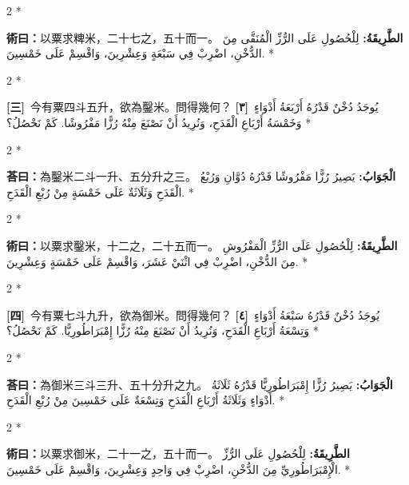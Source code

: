 \documentclass[11pt,a4paper]{article}
\newcommand{\ar}[1]{\arabicfont\beginR #1\endR}
\newcommand{\problemnum}[1]{\textbf{[\ignorespaces#1\unskip]}}
\newenvironment{bilingual}{%
  \begin{paracol}{2}%
  \switchcolumn[0]*%
}{%
  \end{paracol}%
}
\newcommand{\cnline}[1]{\switchcolumn[0]\noindent #1 \switchcolumn[1]}
\newcommand{\arline}[1]{\noindent\ar{#1} \switchcolumn[0]*}
\newenvironment{prob bilingual}{%
  \begin{paracol}{2}%
  \switchcolumn[0]*%
}{%
  \end{paracol}%
  \vspace{0.3em}%
}
\begin{document}
\begin{bilingual}
\cnline{%
\textcolor{methodcolor}{\textbf{術曰：}}以粟求粺米，二十七之，五十而一。
}
\arline{%
\textcolor{methodcolor}{\textbf{الطَّرِيقَةُ:}} لِلْحُصُولِ عَلَى الرُّزِّ الْمُنَقَّى مِنَ الدُّخْنِ، اضْرِبْ فِي سَبْعَةٍ وَعِشْرِينَ، وَاقْسِمْ عَلَى خَمْسِينَ.
}
\end{bilingual}

\begin{bilingual}
\cnline{\problemnum{三}\, 今有粟四斗五升，欲為鑿米。問得幾何？}
\arline{\problemnum{٣}\, يُوجَدُ دُخْنٌ قَدْرُهُ أَرْبَعَةُ أَدْوَاءٍ وَخَمْسَةُ أَرْبَاعِ الْقَدَحِ، وَنُرِيدُ أَنْ نَصْنَعَ مِنْهُ رُزًّا مَفْرُوشًا. كَمْ نَحْصُلُ؟}
\end{bilingual}

\begin{bilingual}
\cnline{\textcolor{answercolor}{\textbf{荅曰：}}為鑿米二斗一升、五分升之三。}
\arline{\textcolor{answercolor}{\textbf{الْجَوَابُ:}} يَصِيرُ رُزًّا مَفْرُوشًا قَدْرُهُ دُوَّانِ وَرُبْعُ الْقَدَحِ وَثَلَاثَةٌ عَلَى خَمْسَةٍ مِنْ رُبْعِ الْقَدَحِ.}
\end{bilingual}

\begin{bilingual}
\cnline{%
\textcolor{methodcolor}{\textbf{術曰：}}以粟求鑿米，十二之，二十五而一。
}
\arline{%
\textcolor{methodcolor}{\textbf{الطَّرِيقَةُ:}} لِلْحُصُولِ عَلَى الرُّزِّ الْمَفْرُوشِ مِنَ الدُّخْنِ، اضْرِبْ فِي اثْنَيْ عَشَرَ، وَاقْسِمْ عَلَى خَمْسَةٍ وَعِشْرِينَ.
}
\end{bilingual}

\begin{bilingual}
\cnline{\problemnum{四}\, 今有粟七斗九升，欲為御米。問得幾何？}
\arline{\problemnum{٤}\, يُوجَدُ دُخْنٌ قَدْرُهُ سَبْعَةُ أَدْوَاءٍ وَتِسْعَةُ أَرْبَاعِ الْقَدَحِ، وَنُرِيدُ أَنْ نَصْنَعَ مِنْهُ رُزًّا إِمْبَرَاطُورِيًّا. كَمْ نَحْصُلُ؟}
\end{bilingual}

\begin{bilingual}
\cnline{\textcolor{answercolor}{\textbf{荅曰：}}為御米三斗三升、五十分升之九。}
\arline{\textcolor{answercolor}{\textbf{الْجَوَابُ:}} يَصِيرُ رُزًّا إِمْبَرَاطُورِيًّا قَدْرُهُ ثَلَاثَةُ أَدْوَاءٍ وَثَلَاثَةُ أَرْبَاعِ الْقَدَحِ وَتِسْعَةٌ عَلَى خَمْسِينَ مِنْ رُبْعِ الْقَدَحِ.}
\end{bilingual}

\begin{bilingual}
\cnline{%
\textcolor{methodcolor}{\textbf{術曰：}}以粟求御米，二十一之，五十而一。
}
\arline{%
\textcolor{methodcolor}{\textbf{الطَّرِيقَةُ:}} لِلْحُصُولِ عَلَى الرُّزِّ الْإِمْبَرَاطُورِيِّ مِنَ الدُّخْنِ، اضْرِبْ فِي وَاحِدٍ وَعِشْرِينَ، وَاقْسِمْ عَلَى خَمْسِينَ.
}
\end{bilingual}
\end{document}
